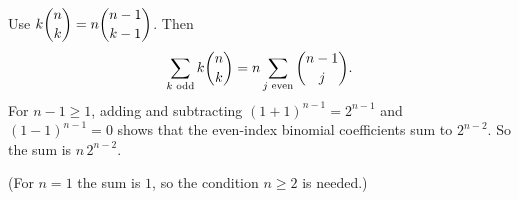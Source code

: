 Use $k\dbinom nk=n\dbinom{n-1}{k-1}$. Then
\[\sum_{k\text{ odd}}k\dbinom nk=n\sum_{j\text{ even}}\dbinom{n-1}{j}.\]
For $n-1\ge1$, adding and subtracting $(1+1)^{n-1}=2^{n-1}$ and $(1-1)^{n-1}=0$ shows that the even-index binomial coefficients sum to $2^{n-2}$. So the sum is $\boxed{n\,2^{n-2}}$.

(For $n=1$ the sum is $1$, so the condition $n\ge2$ is needed.)
